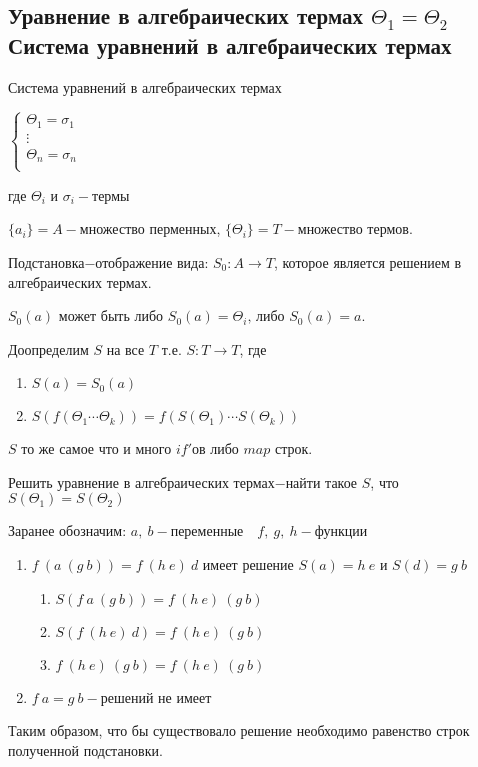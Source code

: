 	\subsection{Уравнение в алгебраических термах $\Theta_1=\Theta_2$\\Система уравнений в алгебраических термах}
	\begin{definition}Система уравнений в алгебраических термах\end{definition}
	$
		\begin{cases}
			\Theta_1=\sigma_1&\\
			\vdots&\\
			\Theta_n=\sigma_n&\\
		\end{cases}
	$\par где $\Theta_i \text{ и } \sigma_i-\text{термы}$\par
	\begin{definition}$\{a_i\}=A-$множество перменных, $\{\Theta_i\}=T-$множество термов.\end{definition}
	\begin{definition}Подстановка$-$отображение вида: $S_0:A\to T$, которое является решением в алгебраических термах.\par $S_0(a)$ может быть либо $S_0(a)=\Theta_i\text{, либо }S_0(a)=a$.\end{definition}
	Доопределим $S$ на все $T$ т.е. $S:T\to T$, где \begin{enumerate}
		\item $S(a)=S_0(a)$
		\item $S(f(\Theta_1 \dotsb \Theta_k))=f(S(\Theta_1) \dotsb S(\Theta_k))$
	\end{enumerate}
	$S$ то же самое что и много $if'$ов либо $map$ строк.\par
	\begin{definition}Решить уравнение в алгебраических термах$-$найти такое $S$, что $S(\Theta_1)=S(\Theta_2)$\end{definition}
	\begin{example}\end{example}
		Заранее обозначим: $a,\:b-\text{переменные}\hspace{1em} f,\:g,\:h-\text{функции}$
		\begin{enumerate}
			\item $f\:(a\:(g\:b))=f\:(h\:e)\:d$ имеет решение $S(a)=h\:e\text{ и }S(d)=g\:b$
				\begin{enumerate}
					\item $S(f\:a\:(g\:b))=f\:(h\:e)\:(g\:b)$
					\item $S(f\:(h\:e)\:d)=f\:(h\:e)\:(g\:b)$
					\item $f\:(h\:e)\:(g\:b)=f\:(h\:e)\:(g\:b)$
				\end{enumerate}
			\item $f\:a=g\:b-$решений не имеет
		\end{enumerate}
		Таким образом, что бы существовало решение необходимо равенство строк полученной подстановки.\par
